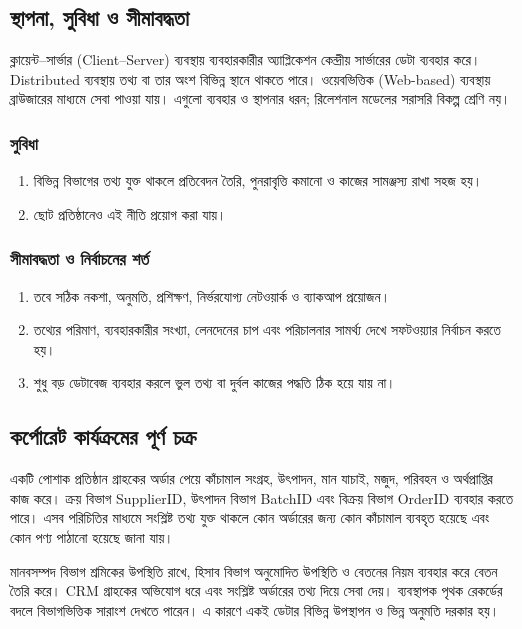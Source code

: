 \subsection{স্থাপনা, সুবিধা ও সীমাবদ্ধতা}
ক্লায়েন্ট--সার্ভার (Client--Server) ব্যবস্থায় ব্যবহারকারীর অ্যাপ্লিকেশন কেন্দ্রীয় সার্ভারের ডেটা ব্যবহার করে। Distributed ব্যবস্থায় তথ্য বা তার অংশ বিভিন্ন স্থানে থাকতে পারে। ওয়েবভিত্তিক (Web-based) ব্যবস্থায় ব্রাউজারের মাধ্যমে সেবা পাওয়া যায়। এগুলো ব্যবহার ও স্থাপনার ধরন; রিলেশনাল মডেলের সরাসরি বিকল্প শ্রেণি নয়।

\subsubsection{সুবিধা}
\begin{enumerate}
\item বিভিন্ন বিভাগের তথ্য যুক্ত থাকলে প্রতিবেদন তৈরি, পুনরাবৃত্তি কমানো ও কাজের সামঞ্জস্য রাখা সহজ হয়।
\item ছোট প্রতিষ্ঠানেও এই নীতি প্রয়োগ করা যায়।
\end{enumerate}
\subsubsection{সীমাবদ্ধতা ও নির্বাচনের শর্ত}
\begin{enumerate}
\item তবে সঠিক নকশা, অনুমতি, প্রশিক্ষণ, নির্ভরযোগ্য নেটওয়ার্ক ও ব্যাকআপ প্রয়োজন।
\item তথ্যের পরিমাণ, ব্যবহারকারীর সংখ্যা, লেনদেনের চাপ এবং পরিচালনার সামর্থ্য দেখে সফটওয়্যার নির্বাচন করতে হয়।
\item শুধু বড় ডেটাবেজ ব্যবহার করলে ভুল তথ্য বা দুর্বল কাজের পদ্ধতি ঠিক হয়ে যায় না।
\end{enumerate}

\subsection{কর্পোরেট কার্যক্রমের পূর্ণ চক্র}
একটি পোশাক প্রতিষ্ঠান গ্রাহকের অর্ডার পেয়ে কাঁচামাল সংগ্রহ, উৎপাদন, মান যাচাই, মজুদ, পরিবহন ও অর্থপ্রাপ্তির কাজ করে। ক্রয় বিভাগ SupplierID, উৎপাদন বিভাগ BatchID এবং বিক্রয় বিভাগ OrderID ব্যবহার করতে পারে। এসব পরিচিতির মাধ্যমে সংশ্লিষ্ট তথ্য যুক্ত থাকলে কোন অর্ডারের জন্য কোন কাঁচামাল ব্যবহৃত হয়েছে এবং কোন পণ্য পাঠানো হয়েছে জানা যায়।

মানবসম্পদ বিভাগ শ্রমিকের উপস্থিতি রাখে, হিসাব বিভাগ অনুমোদিত উপস্থিতি ও বেতনের নিয়ম ব্যবহার করে বেতন তৈরি করে। CRM গ্রাহকের অভিযোগ ধরে এবং সংশ্লিষ্ট অর্ডারের তথ্য দিয়ে সেবা দেয়। ব্যবস্থাপক পৃথক রেকর্ডের বদলে বিভাগভিত্তিক সারাংশ দেখতে পারেন। এ কারণে একই ডেটার বিভিন্ন উপস্থাপন ও ভিন্ন অনুমতি দরকার হয়।

